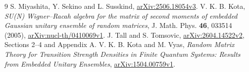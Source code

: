 \documentclass[11pt,a4paper]{article}
\begin{document}
\begin{thebibliography}{9}
 S. Miyashita, Y. Sekino and L. Susskind,
\href{https://arxiv.org/html/2506.18054v3}{arXiv:2506.18054v3}.
 V. K. B. Kota, \emph{SU(N) Wigner--Racah algebra for the
matrix of second moments of embedded Gaussian unitary ensemble of
random matrices}, J. Math. Phys. \textbf{46}, 033514 (2005),
\href{https://arxiv.org/html/nucl-th/0410069v1}{arXiv:nucl-th/0410069v1}.
 J. Tall and S. Tomsovic,
\href{https://arxiv.org/html/2604.14522v2}{arXiv:2604.14522v2},
Sections 2--4 and Appendix A.
 V. K. B. Kota and M. Vyas, \emph{Random Matrix Theory for
Transition Strength Densities in Finite Quantum Systems: Results from
Embedded Unitary Ensembles},
\href{https://arxiv.org/html/1504.00759v1}{arXiv:1504.00759v1}.
\end{thebibliography}
\end{document}
